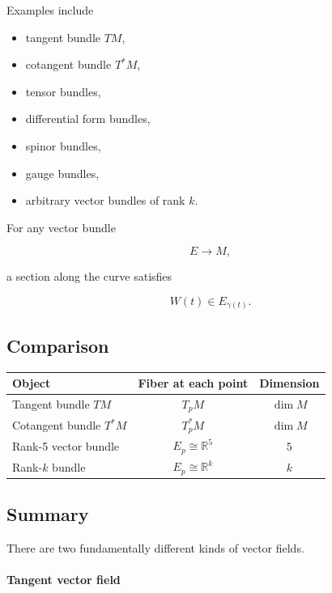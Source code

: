 \documentclass[12pt,a4paper]{article}
\theoremstyle{notespace}
\begin{document}
Examples include

\begin{itemize}
	\item tangent bundle \(TM\),
	\item cotangent bundle \(T^*M\),
	\item tensor bundles,
	\item differential form bundles,
	\item spinor bundles,
	\item gauge bundles,
	\item arbitrary vector bundles of rank \(k\).
\end{itemize}

For any vector bundle

\[
E
\longrightarrow
M,
\]

a section along the curve satisfies

\[
\boxed{
	W(t)\in E_{\gamma(t)}.
}
\]


\subsection{Comparison}

\begin{center}
	\begin{tabular}{|l|c|c|}
		\hline
		Object & Fiber at each point & Dimension\\
		\hline
		Tangent bundle \(TM\) & \(T_pM\) & \(\dim M\)\\
		Cotangent bundle \(T^*M\) & \(T_p^*M\) & \(\dim M\)\\
		Rank-5 vector bundle & \(E_p\cong\mathbb R^5\) & \(5\)\\
		Rank-\(k\) bundle & \(E_p\cong\mathbb R^k\) & \(k\)\\
		\hline
	\end{tabular}
\end{center}


\subsection{Summary}

There are two fundamentally different kinds of vector fields.

\paragraph{Tangent vector field}
\end{document}
